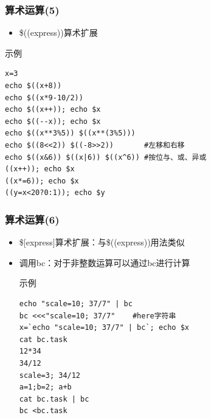 \documentclass[xcolor=svgnames,presentation]{beamer}
\begin{document}
\begin{frame}[fragile]
\frametitle{算术运算(5)}
\label{sec-1-2-22}
\begin{itemize}

\item \$((express))算术扩展
\label{sec-1-2-22-1}%
\end{itemize} %
\begin{exampleblock}{示例}
\label{sec-1-2-22-2}


\begin{verbatim}
x=3
echo $((x+8))
echo $((x*9-10/2))
echo $((x++)); echo $x
echo $((--x)); echo $x
echo $((x**3%5)) $((x**(3%5)))
echo $((8<<2)) $((-8>>2))       #左移和右移
echo $((x&6)) $((x|6)) $((x^6)) #按位与、或、异或
((x++)); echo $x
((x*=6)); echo $x
((y=x<20?0:1)); echo $y
\end{verbatim}
\end{exampleblock}
\end{frame}
\begin{frame}[fragile]
\frametitle{算术运算(6)}
\label{sec-1-2-23}
\begin{itemize}

\item \$[express]算术扩展：与\$((express))用法类似
\label{sec-1-2-23-1}%

\item 调用bc：对于非整数运算可以通过bc进行计算
\label{sec-1-2-23-2}%
\begin{exampleblock}{示例}
\label{sec-1-2-23-2-1}


\begin{verbatim}
echo "scale=10; 37/7" | bc
bc <<<"scale=10; 37/7"    #here字符串
x=`echo "scale=10; 37/7" | bc`; echo $x
cat bc.task
12*34
34/12
scale=3; 34/12
a=1;b=2; a+b
cat bc.task | bc
bc <bc.task
\end{verbatim}
\end{exampleblock}
\end{itemize} %
\end{frame}
\end{document}
